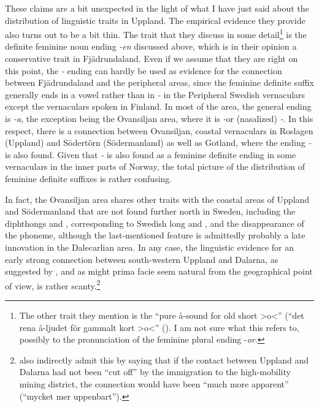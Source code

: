 These claims are a bit unexpected in the light of what I have just said about the distribution of linguistic traits in Uppland. The empirical evidence they provide also turns out to be a bit thin. The trait that they discuss in some detail\footnote{ The other trait they mention is the “pure å-sound for old short {\textgreater}o{\textless}” (“det rena å-ljudet för gammalt kort {\textgreater}o{\textless}” (\citet[315]{LindströmEtAl2006}). I am not sure what this refers to, possibly to the pronunciation of the feminine plural ending -\textit{o}\textit{r}.} is the definite feminine noun ending \textit{{}-en} discussed above, which is in their opinion a conservative trait in Fjädrundaland. Even if we assume that they are right on this point, the\textit{ {}-} ending can hardly be used as evidence for the connection between Fjädrundaland and the peripheral areas, since the feminine definite suffix generally ends in a vowel rather than in\textit{ {}-} in the Peripheral Swedish vernaculars except the vernaculars spoken in Finland.  In most of the area, the general ending is\textit{ {}-a}, the exception being the Ovansiljan area, where it is\textit{ {}-}or (nasalized)\textit{ {}-}. In this respect, there is a connection between Ovansiljan, coastal vernaculars in Roslagen (Uppland) and Södertörn (Södermanland) as well as Gotland, where the ending\textit{ {}-} is also found. Given that\textit{ {}-} is also found as a feminine definite ending in some vernaculars in the inner parts of Norway, the total picture of the distribution of feminine definite suffixes is rather confusing. 

In fact, the Ovansiljan area shares other traits with the coastal areas of Uppland and Södermanland that are not found further north in Sweden, including the diphthongs  and , corresponding to Swedish long  and , and the disappearance of the  phoneme, although the last-mentioned feature is admittedly probably a late innovation in the Dalecarlian area. In any case, the linguistic evidence for an early strong connection between south-western Uppland and Dalarna, as suggested by \citet[237]{LindströmEtAl2006}, and as might prima facie seem natural from the geographical point of view, is rather scanty.\footnote{\citet[237]{LindströmEtAl2006} also indirectly admit this by saying that if the contact between Uppland and Dalarna had not been “cut off” by the immigration to the high-mobility mining district, the connection would have been “much more apparent” (“mycket mer uppenbart”).}

